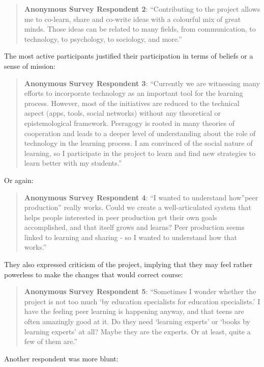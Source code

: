 \begin{quote}
\textbf{Anonymous Survey Respondent 2}: ``Contributing to the project
allows me to co-learn, share and co-write ideas with a colourful mix of
great minds. Those ideas can be related to many fields, from
communication, to technology, to psychology, to sociology, and more.''
\end{quote}
The most active participants justified their participation in terms of
beliefs or a sense of mission:

\begin{quote}
\textbf{Anonymous Survey Respondent 3}: ``Currently we are witnessing
many efforts to incorporate technology as an important tool for the
learning process. However, most of the initiatives are reduced to the
technical aspect (apps, tools, social networks) without any theoretical
or epistemological framework. Peeragogy is rooted in many theories of
cooperation and leads to a deeper level of understanding about the role
of technology in the learning process. I am convinced of the social
nature of learning, so I participate in the project to learn and find
new strategies to learn better with my students.''
\end{quote}
Or again:

\begin{quote}
\textbf{Anonymous Survey Respondent 4}: ``I wanted to understand
how''peer production'' really works. Could we create a well-articulated
system that helps people interested in peer production get their own
goals accomplished, and that itself grows and learns? Peer production
seems linked to learning and sharing - so I wanted to understand how
that works.''
\end{quote}
They also expressed criticism of the project, implying that they may
feel rather powerless to make the changes that would correct course:

\begin{quote}
\textbf{Anonymous Survey Respondent 5}: ``Sometimes I wonder whether the
project is not too much `by education specialists for education
specialists.' I have the feeling peer learning is happening anyway, and
that teens are often amazingly good at it. Do they need `learning
experts' or `books by learning experts' at all? Maybe they are the
experts. Or at least, quite a few of them are.''
\end{quote}
Another respondent was more blunt:

